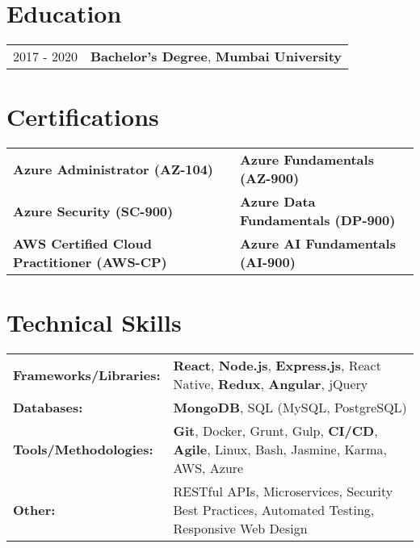 \documentclass[a4paper,11pt]{article}
\begin{document}
\section{Education}
\begin{tabularx}{\linewidth}{@{}l X@{}}	
2017 - 2020 & \textbf{Bachelor's Degree}, \textbf{Mumbai University} \\ 
\end{tabularx}

\section{Certifications}
\begin{tabularx}{\linewidth}{@{}l X l@{}}
\textbf{Azure Administrator (AZ-104)} & & \textbf{Azure Fundamentals (AZ-900)} \\
\textbf{Azure Security (SC-900)} & & \textbf{Azure Data Fundamentals (DP-900)} \\
\textbf{AWS Certified Cloud Practitioner (AWS-CP)} & & \textbf{Azure AI Fundamentals (AI-900)} \\
\end{tabularx}


\section{Technical Skills}
\begin{tabularx}{\linewidth}{@{}l X@{}}

\textbf{Frameworks/Libraries:} & \textbf{React}, \textbf{Node.js}, \textbf{Express.js}, React Native, \textbf{Redux}, \textbf{Angular}, jQuery \\
\textbf{Databases:} & \textbf{MongoDB}, SQL (MySQL, PostgreSQL) \\
\textbf{Tools/Methodologies:} & \textbf{Git}, Docker, Grunt, Gulp, \textbf{CI/CD}, \textbf{Agile}, Linux, Bash, Jasmine, Karma, AWS, Azure \\ 
\textbf{Other:} & RESTful APIs, Microservices, Security Best Practices, Automated Testing, Responsive Web Design \\ 
\end{tabularx}

\vfill
\end{document}
